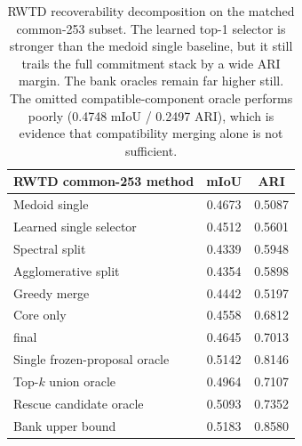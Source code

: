 \begin{table}[t]
\centering
\scriptsize
\begin{tabular}{@{}lcc@{}}
\toprule
RWTD common-253 method & mIoU & ARI \\
\midrule
Medoid single & 0.4673 & 0.5087 \\
Learned single selector & 0.4512 & 0.5601 \\
Spectral split & 0.4339 & 0.5948 \\
Agglomerative split & 0.4354 & 0.5898 \\
Greedy merge & 0.4442 & 0.5197 \\
Core only & 0.4558 & 0.6812 \\
\sys{} final & 0.4645 & 0.7013 \\
Single frozen-proposal oracle & 0.5142 & 0.8146 \\
Top-$k$ union oracle & 0.4964 & 0.7107 \\
Rescue candidate oracle & 0.5093 & 0.7352 \\
Bank upper bound & 0.5183 & 0.8580 \\
\bottomrule
\end{tabular}
\caption{RWTD recoverability decomposition on the matched common-253 subset. The learned top-1 selector is stronger than the medoid single baseline, but it still trails the full commitment stack by a wide ARI margin. The bank oracles remain far higher still. The omitted compatible-component oracle performs poorly (0.4748 mIoU / 0.2497 ARI), which is evidence that compatibility merging alone is not sufficient.}
\label{tab:oracle_recoverability}
\end{table}
